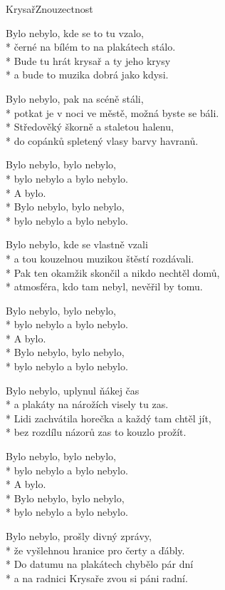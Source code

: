\documentclass[10.5pt]{book}
\begin{document}
\begin{poem}{Krysař}{Znouzectnost}

\settowidth{\versewidth}{a hodně dlouho v tomhle městě byl cítit vzduch křivdou.}

Bylo nebylo, kde se to tu vzalo,\\*
černé na bílém to na plakátech stálo.\\*
Bude tu hrát krysař a ty jeho krysy\\*
a bude to muzika dobrá jako kdysi.

Bylo nebylo, pak na scéně stáli,\\*
potkat je v noci ve městě, možná byste se báli.\\*
Středověký škorně a staletou halenu,\\*
do copánků spletený vlasy barvy havranů.

Bylo nebylo, bylo nebylo,\\*
bylo nebylo a bylo nebylo.\\*
A bylo. \\*
Bylo nebylo, bylo nebylo,\\*
bylo nebylo a bylo nebylo.

Bylo nebylo, kde se vlastně vzali\\*
a tou kouzelnou muzikou štěstí rozdávali.\\*
Pak ten okamžik skončil a nikdo nechtěl domů,\\*
atmosféra, kdo tam nebyl, nevěřil by tomu.

Bylo nebylo, bylo nebylo,\\*
bylo nebylo a bylo nebylo.\\*
A bylo. \\*
Bylo nebylo, bylo nebylo,\\*
bylo nebylo a bylo nebylo.

Bylo nebylo, uplynul ňákej čas\\*
a plakáty na nárožích visely tu zas.\\*
Lidi zachvátila horečka a každý tam chtěl jít,\\*
bez rozdílu názorů zas to kouzlo prožít.

Bylo nebylo, bylo nebylo,\\*
bylo nebylo a bylo nebylo.\\*
A bylo. \\*
Bylo nebylo, bylo nebylo,\\*
bylo nebylo a bylo nebylo.

Bylo nebylo, prošly divný zprávy,\\*
že vyšlehnou hranice pro čerty a ďábly.\\*
Do datumu na plakátech chybělo pár dní\\*
a na radnici Krysaře zvou si páni radní.


\end{poem}
\end{document}
